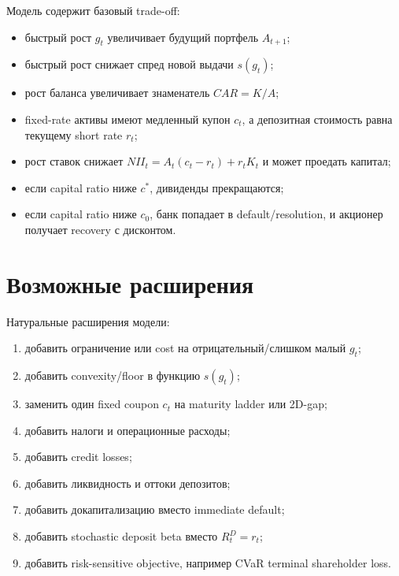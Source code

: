 \documentclass[11pt,a4paper]{article}
\newcommand{\1}{\mathbf{1}}
\begin{document}
Модель содержит базовый trade-off:
\begin{itemize}
    \item быстрый рост $g_t$ увеличивает будущий портфель $A_{t+1}$;
    \item быстрый рост снижает спред новой выдачи $s(g_t)$;
    \item рост баланса увеличивает знаменатель $CAR=K/A$;
    \item fixed-rate активы имеют медленный купон $c_t$, а депозитная стоимость равна текущему short rate $r_t$;
    \item рост ставок снижает $NII_t=A_t(c_t-r_t)+r_tK_t$ и может проедать капитал;
    \item если capital ratio ниже $c^*$, дивиденды прекращаются;
    \item если capital ratio ниже $c_0$, банк попадает в default/resolution, и акционер получает recovery с дисконтом.
\end{itemize}

\section{Возможные расширения}

Натуральные расширения модели:
\begin{enumerate}[noitemsep]
    \item добавить ограничение или cost на отрицательный/слишком малый $g_t$;
    \item добавить convexity/floor в функцию $s(g_t)$;
    \item заменить один fixed coupon $c_t$ на maturity ladder или 2D-gap;
    \item добавить налоги и операционные расходы;
    \item добавить credit losses;
    \item добавить ликвидность и оттоки депозитов;
    \item добавить докапитализацию вместо immediate default;
    \item добавить stochastic deposit beta вместо $R_t^D=r_t$;
    \item добавить risk-sensitive objective, например CVaR terminal shareholder loss.
\end{enumerate}
\end{document}
